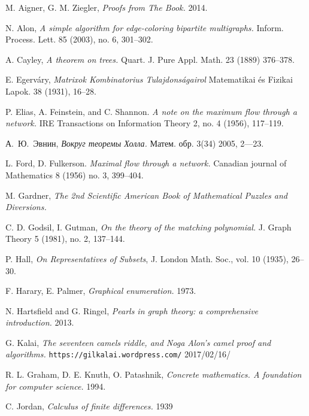 \begin{thebibliography}{52}

 M. Aigner, G. M. Ziegler,  \emph{Proofs from The Book.} 2014.

 N. Alon,
\emph{A simple algorithm for edge-coloring bipartite multigraphs.}
Inform. Process. Lett. 85 (2003), no. 6, 301--302. 

A. Cayley, \emph{A theorem on trees.} Quart. J. Pure Appl. Math. 23 (1889) 376--378.

E. Egerv\'ary, 
\emph{Matrixok Kombinatorius Tulajdons\'agairol}
Matematikai \'es Fizikai Lapok. 38 (1931), 16--28.

 P. Elias, A. Feinstein, and C. Shannon. 
\emph{A note on the maximum flow through a network.}
IRE Transactions on Information Theory 2, no. 4 (1956), 117--119.

 \begin{otherlanguage}{russian}
А.~Ю.~Эвнин,
\emph{Вокруг теоремы Холла.} Матем. обр. 3(34) 2005, 2---23.
 \end{otherlanguage}

 L. Ford, D. Fulkerson. 
\emph{Maximal flow through a network.} 
Canadian journal of Mathematics 8 (1956) no. 3, 399--404.

 M. Gardner, \emph{The 2nd Scientific American Book of Mathematical Puzzles and Diversions.}

C. D. Godsil, I. Gutman, 
\emph{On the theory of the matching polynomial.}
J. Graph Theory 5 (1981), no. 2, 137–144.

P. Hall, 
\emph{On Representatives of Subsets}, 
J. London Math. Soc., vol. 10 (1935), 26--30.

 F. Harary, E. Palmer, 
\emph{Graphical enumeration.} 1973.

 N. Hartsfield and  G. Ringel, 
\emph{Pearls in graph theory: a comprehensive introduction.} 2013.

 G. Kalai, 
\emph{The seventeen camels riddle, and Noga Alon’s camel proof and algorithms.}
\texttt{https://gilkalai.wordpress.com/} 2017/02/16/

 R. L. Graham, D. E. Knuth, O. Patashnik, 
\emph{Concrete mathematics. A foundation for computer science.}
1994.

 C. Jordan, 
\emph{Calculus of finite differences.}
1939


\end{thebibliography}
